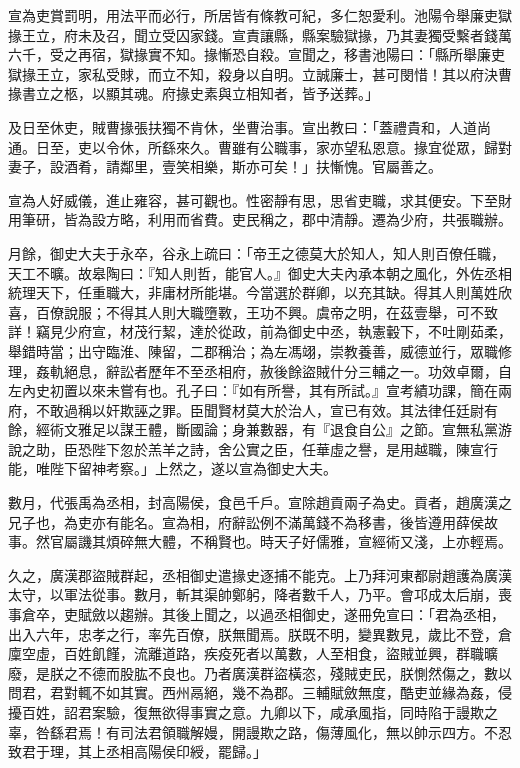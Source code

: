 \begin{pinyinscope}
宣為吏賞罰明，用法平而必行，所居皆有條教可紀，多仁恕愛利。池陽令舉廉吏獄掾王立，府未及召，聞立受囚家錢。宣責讓縣，縣案驗獄掾，乃其妻獨受繫者錢萬六千，受之再宿，獄掾實不知。掾慚恐自殺。宣聞之，移書池陽曰：「縣所舉廉吏獄掾王立，家私受賕，而立不知，殺身以自明。立誠廉士，甚可閔惜！其以府決曹掾書立之柩，以顯其魂。府掾史素與立相知者，皆予送葬。」

及日至休吏，賊曹掾張扶獨不肯休，坐曹治事。宣出教曰：「蓋禮貴和，人道尚通。日至，吏以令休，所繇來久。曹雖有公職事，家亦望私恩意。掾宜從眾，歸對妻子，設酒肴，請鄰里，壹笑相樂，斯亦可矣！」扶慚愧。官屬善之。

宣為人好威儀，進止雍容，甚可觀也。性密靜有思，思省吏職，求其便安。下至財用筆研，皆為設方略，利用而省費。吏民稱之，郡中清靜。遷為少府，共張職辦。

月餘，御史大夫于永卒，谷永上疏曰：「帝王之德莫大於知人，知人則百僚任職，天工不曠。故皋陶曰：『知人則哲，能官人。』御史大夫內承本朝之風化，外佐丞相統理天下，任重職大，非庸材所能堪。今當選於群卿，以充其缺。得其人則萬姓欣喜，百僚說服；不得其人則大職墮斁，王功不興。虞帝之明，在茲壹舉，可不致詳！竊見少府宣，材茂行絜，達於從政，前為御史中丞，執憲轂下，不吐剛茹柔，舉錯時當；出守臨淮、陳留，二郡稱治；為左馮翊，崇教養善，威德並行，眾職修理，姦軌絕息，辭訟者歷年不至丞相府，赦後餘盜賊什分三輔之一。功效卓爾，自左內史初置以來未嘗有也。孔子曰：『如有所譽，其有所試。』宣考績功課，簡在兩府，不敢過稱以奸欺誣之罪。臣聞賢材莫大於治人，宣已有效。其法律任廷尉有餘，經術文雅足以謀王體，斷國論；身兼數器，有『退食自公』之節。宣無私黨游說之助，臣恐陛下忽於羔羊之詩，舍公實之臣，任華虛之譽，是用越職，陳宣行能，唯陛下留神考察。」上然之，遂以宣為御史大夫。

數月，代張禹為丞相，封高陽侯，食邑千戶。宣除趙貢兩子為史。貢者，趙廣漢之兄子也，為吏亦有能名。宣為相，府辭訟例不滿萬錢不為移書，後皆遵用薛侯故事。然官屬譏其煩碎無大體，不稱賢也。時天子好儒雅，宣經術又淺，上亦輕焉。

久之，廣漢郡盜賊群起，丞相御史遣掾史逐捕不能克。上乃拜河東都尉趙護為廣漢太守，以軍法從事。數月，斬其渠帥鄭躬，降者數千人，乃平。會邛成太后崩，喪事倉卒，吏賦斂以趨辦。其後上聞之，以過丞相御史，遂冊免宣曰：「君為丞相，出入六年，忠孝之行，率先百僚，朕無聞焉。朕既不明，變異數見，歲比不登，倉廩空虛，百姓飢饉，流離道路，疾疫死者以萬數，人至相食，盜賊並興，群職曠廢，是朕之不德而股肱不良也。乃者廣漢群盜橫恣，殘賊吏民，朕惻然傷之，數以問君，君對輒不如其實。西州鬲絕，幾不為郡。三輔賦斂無度，酷吏並緣為姦，侵擾百姓，詔君案驗，復無欲得事實之意。九卿以下，咸承風指，同時陷于謾欺之辜，咎繇君焉！有司法君領職解嫚，開謾欺之路，傷薄風化，無以帥示四方。不忍致君于理，其上丞相高陽侯印綬，罷歸。」


\end{pinyinscope}
